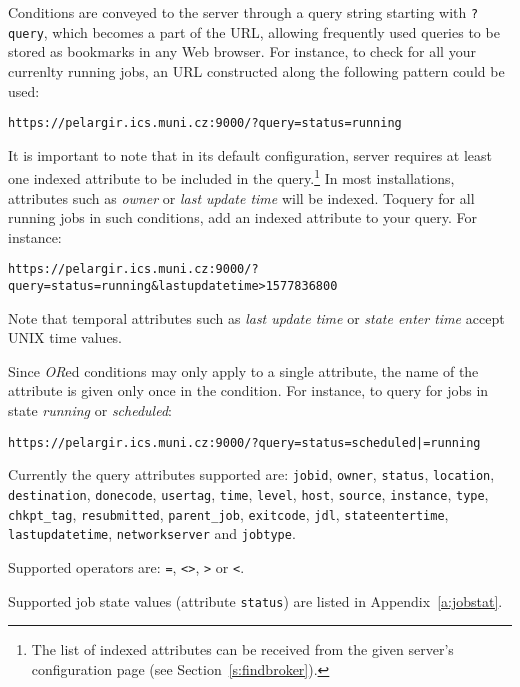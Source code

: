 Conditions are conveyed to the \LB server through a query string starting with \texttt{?query}, which becomes a part of the URL, allowing frequently used queries to be stored as bookmarks in any Web browser. For instance, to check for all your currenlty running jobs, an URL constructed along the following pattern could be used:

\begin{verbatim}
https://pelargir.ics.muni.cz:9000/?query=status=running
\end{verbatim}

It is important to note that in its default configuration, \LB server requires at least one indexed attribute to be included in the query.\footnote{The list of indexed attributes can be received from the given \LB server's configuration page (see Section~\ref{s:findbroker}).} In most installations, attributes such as \emph{owner} or \emph{last update time} will be indexed. Toquery for all running jobs in such conditions, add an indexed attribute to your query. For instance:

\begin{verbatim}
https://pelargir.ics.muni.cz:9000/?query=status=running&lastupdatetime>1577836800
\end{verbatim}

Note that temporal attributes such as \emph{last update time} or \emph{state enter time} accept UNIX time values.

Since \emph{OR}ed conditions may only apply to a single attribute, the name of the attribute is given only once in the condition. For instance, to query for jobs in state \emph{running} or \emph{scheduled}:

\begin{verbatim}
https://pelargir.ics.muni.cz:9000/?query=status=scheduled|=running
\end{verbatim}

{\raggedright{}Currently the query attributes supported are: \texttt{jobid}, \texttt{owner}, \texttt{status}, \texttt{location}, \texttt{destination}, \texttt{donecode}, \texttt{usertag}, \texttt{time}, \texttt{level}, \texttt{host}, \texttt{source}, \texttt{instance}, \texttt{type}, \texttt{chkpt\_tag}, \texttt{resubmitted}, \texttt{parent\_job}, \texttt{exitcode}, \texttt{jdl}, \texttt{stateentertime}, \texttt{lastupdatetime}, \texttt{networkserver} and \texttt{jobtype}.}

Supported operators are: \texttt{=}, \texttt{<>}, \texttt{>} or \texttt{<}.

Supported job state values (attribute \texttt{status}) are listed in Appendix~\ref{a:jobstat}.

